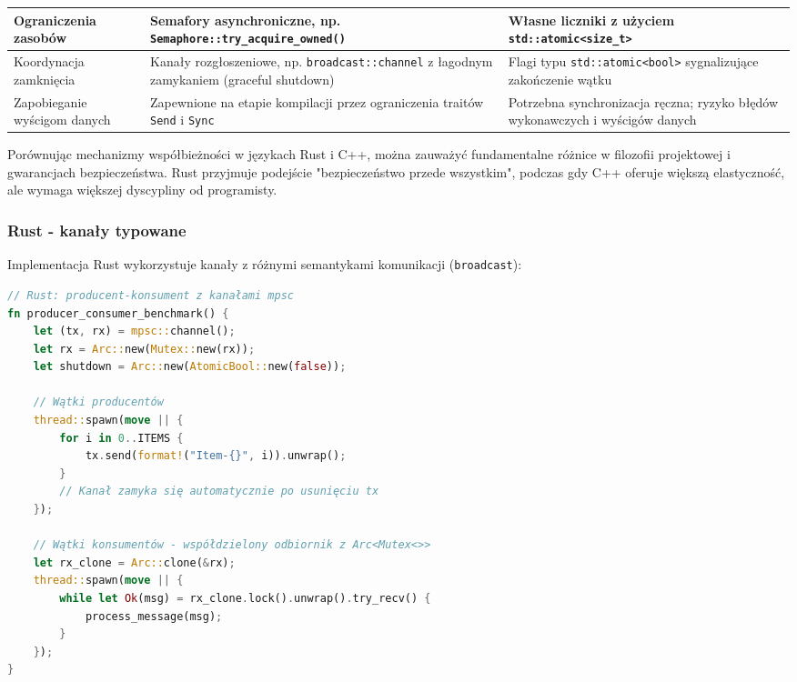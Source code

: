 \begin{table}[H]
\begin{tabularx}{\textwidth}{l>{\raggedright\arraybackslash}X>{\raggedright\arraybackslash}X}
        \midrule
        Ograniczenia zasobów &
        Semafory asynchroniczne, np. \texttt{Semaphore::try\_acquire\_owned()} &
        Własne liczniki z użyciem \texttt{std::atomic<size\_t>} \\
        \midrule
        Koordynacja zamknięcia &
        Kanały rozgłoszeniowe, np. \texttt{broadcast::channel} z łagodnym zamykaniem (graceful shutdown) &
        Flagi typu \texttt{std::atomic<bool>} sygnalizujące zakończenie wątku \\
        \midrule
        Zapobieganie wyścigom danych &
        Zapewnione na etapie kompilacji przez ograniczenia traitów \texttt{Send} i \texttt{Sync} &
        Potrzebna synchronizacja ręczna; ryzyko błędów wykonawczych i wyścigów danych \\
        \bottomrule
    \end{tabularx}
\end{table}


Porównując mechanizmy współbieżności w językach Rust i C++, można zauważyć fundamentalne różnice w filozofii projektowej i gwarancjach bezpieczeństwa. Rust przyjmuje podejście "bezpieczeństwo przede wszystkim", podczas gdy C++ oferuje większą elastyczność, ale wymaga większej dyscypliny od programisty.

\subsubsection{Rust - kanały typowane}
Implementacja Rust wykorzystuje kanały z różnymi semantykami komunikacji (\texttt{broadcast}):
\begin{lstlisting}[language=Rust, caption={Producent-Konsument w Rust z mpsc channels}, label={lst:rust_producer_consumer}]
// Rust: producent-konsument z kanałami mpsc
fn producer_consumer_benchmark() {
    let (tx, rx) = mpsc::channel();
    let rx = Arc::new(Mutex::new(rx));
    let shutdown = Arc::new(AtomicBool::new(false));
    
    // Wątki producentów
    thread::spawn(move || {
        for i in 0..ITEMS {
            tx.send(format!("Item-{}", i)).unwrap();
        }
        // Kanał zamyka się automatycznie po usunięciu tx
    });

    // Wątki konsumentów - współdzielony odbiornik z Arc<Mutex<>>
    let rx_clone = Arc::clone(&rx);
    thread::spawn(move || {
        while let Ok(msg) = rx_clone.lock().unwrap().try_recv() {
            process_message(msg);
        }
    });
}
\end{lstlisting}

